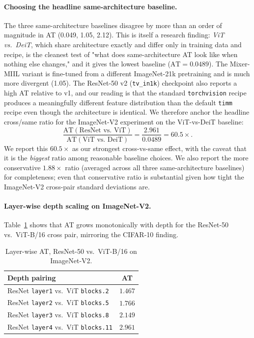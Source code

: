 \documentclass[11pt]{article}
\begin{document}
\paragraph{Choosing the headline same-architecture baseline.}
The three same-architecture baselines disagree by more than an order
of magnitude in AT (0.049, 1.05, 2.12). This is itself a research
finding: \emph{ViT vs.\ DeiT}, which share architecture exactly and
differ only in training data and recipe, is the cleanest test of "what
does same-architecture AT look like when nothing else changes," and
it gives the lowest baseline ($\mathrm{AT} = 0.0489$). The Mixer-MIIL
variant is fine-tuned from a different ImageNet-21k pretraining and is
much more divergent (1.05). The ResNet-50 v2 (\texttt{tv\_in1k})
checkpoint also reports a high AT relative to v1, and our reading is
that the standard \texttt{torchvision} recipe produces a meaningfully
different feature distribution than the default
\texttt{timm} recipe even though the architecture is identical. We
therefore anchor the headline cross/same ratio for the ImageNet-V2
experiment on the ViT-vs-DeiT baseline:
\begin{equation*}
\frac{\mathrm{AT}(\text{ResNet vs.\ ViT})}{\mathrm{AT}(\text{ViT vs.\ DeiT})}
= \frac{2.961}{0.0489} = 60.5\times.
\end{equation*}
We report this $60.5\times$ as our strongest cross-vs-same effect, with
the caveat that it is the \emph{biggest} ratio among reasonable
baseline choices. We also report the more conservative
$1.88\times$ ratio (averaged across all three same-architecture
baselines) for completeness; even that conservative ratio is
substantial given how tight the ImageNet-V2 cross-pair standard
deviations are.

\paragraph{Layer-wise depth scaling on ImageNet-V2.}
Table~\ref{tab:imagenet-depth} shows that AT grows monotonically with
depth for the ResNet-50 vs.\ ViT-B/16 cross pair, mirroring the CIFAR-10
finding.

\begin{table}[t]
\centering
\caption{Layer-wise AT, ResNet-50 vs.\ ViT-B/16 on ImageNet-V2.}
\label{tab:imagenet-depth}
\begin{tabular}{lc}
\toprule
Depth pairing & AT \\
\midrule
ResNet \texttt{layer1} vs.\ ViT \texttt{blocks.2}  & $1.467$ \\
ResNet \texttt{layer2} vs.\ ViT \texttt{blocks.5}  & $1.766$ \\
ResNet \texttt{layer3} vs.\ ViT \texttt{blocks.8}  & $2.149$ \\
ResNet \texttt{layer4} vs.\ ViT \texttt{blocks.11} & $2.961$ \\
\bottomrule
\end{tabular}
\end{table}
\end{document}
